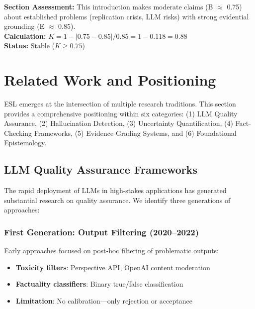 \documentclass[11pt,a4paper]{article}
\begin{document}
\begin{eslbox}
\textbf{Section Assessment:} This introduction makes moderate claims (B $\approx$ 0.75) about established problems (replication crisis, LLM risks) with strong evidential grounding (E $\approx$ 0.85). \\[0.3em]
\textbf{Calculation:} $K = 1 - |0.75 - 0.85| / 0.85 = 1 - 0.118 = 0.88$ \\
\textbf{Status:} Stable ($K \geq 0.75$)
\end{eslbox}

\section{Related Work and Positioning}
\label{sec:related}


ESL emerges at the intersection of multiple research traditions. This section provides a comprehensive positioning within six categories: (1) LLM Quality Assurance, (2) Hallucination Detection, (3) Uncertainty Quantification, (4) Fact-Checking Frameworks, (5) Evidence Grading Systems, and (6) Foundational Epistemology.

\subsection{LLM Quality Assurance Frameworks}

The rapid deployment of LLMs in high-stakes applications has generated substantial research on quality assurance. We identify three generations of approaches:

\subsubsection{First Generation: Output Filtering (2020--2022)}

Early approaches focused on post-hoc filtering of problematic outputs:
\begin{itemize}
    \item \textbf{Toxicity filters}: Perspective API, OpenAI content moderation
    \item \textbf{Factuality classifiers}: Binary true/false classification
    \item \textbf{Limitation}: No calibration---only rejection or acceptance
\end{itemize}
\end{document}
